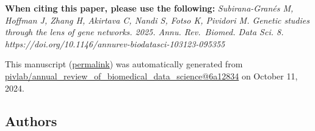 { \textbf{When citing this paper, please use the following:}
\emph{Subirana-Granés M, Hoffman J, Zhang H, Akirtava C, Nandi S, Fotso K, Pividori M. Genetic studies through the lens of gene networks. 2025. Annu. Rev.~Biomed. Data Sci. 8. https://doi.org/10.1146/annurev-biodatasci-103123-095355}}

This manuscript
(\href{https://pivlab.github.io/annual_review_of_biomedical_data_science/v/6a128344693fc244f80501a6df4346fbd4e190e5/}{permalink})
was automatically generated
from \href{https://github.com/pivlab/annual_review_of_biomedical_data_science/tree/6a128344693fc244f80501a6df4346fbd4e190e5}{pivlab/annual\_review\_of\_biomedical\_data\_science@6a12834}
on October 11, 2024.

\hypertarget{authors}{%
\subsection{Authors}\label{authors}}

